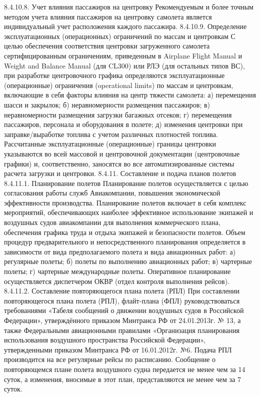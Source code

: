 8.4.10.8. Учет влияния пассажиров на центровку 
Рекомендуемым и более точным методом учета влияния пассажиров на центровку самолета является индивидуальный учет расположения каждого пассажира. 
8.4.10.9. Определение эксплуатационных (операционных) ограничений по массам и центровкам 
С целью обеспечения соответствия центровки загруженного самолета сертифицированным ограничениям, приведенным в Airplane Flight Manual и Weight and Balance Manual (для CL300) или РЛЭ (для остальных типов ВС), при разработке центровочного графика определяются эксплуатационные (операционные) ограничения (operational limits) по массам и центровкам, включающие в себя факторы влияния на центр тяжести самолета: 
а)	перемещения шасси и закрылок; 
б)	неравномерности размещения пассажиров; 
в)	неравномерности размещения загрузки багажных отсеков; 
г)	перемещения пассажиров, персонала и оборудования в полете; 
д)	изменения центровки при заправке/выработке топлива с учетом различных плотностей топлива. 
Рассчитанные эксплуатационные (операционные) границы центровки указываются во всей массовой и центровочной документации (центровочные графики) и, соответственно, заносятся во все автоматизированные системы расчета загрузки и центровки.
8.4.11. Составление и подача планов полетов
8.4.11.1. Планирование полетов
Планирование полетов осуществляется с целью согласования работы служб Авиакомпании, повышения экономической эффективности производства.
Планирование полетов включает в себя комплекс мероприятий, обеспечивающих наиболее эффективное использование экипажей и воздушных судов авиакомпании для выполнения коммерческого плана, обеспечения графика труда и отдыха экипажей и безопасности полетов.
Объем процедур предварительного и непосредственного планирования определяется в зависимости от вида предполагаемого полета и вида авиационных работ:
а)	регулярные полеты;
б)	полеты по выполнению авиационных работ;
в)	чартерные полеты;
г)	чартерные международные полеты.
Оперативное планирование осуществляется диспетчером ОКВР (отдел контроля выполнения рейсов).
8.4.11.2. Составление повторяющегося плана полета (РПЛ)
При составлении повторяющегося плана полета (РПЛ), флайт-плана (ФПЛ) руководствоваться требованиями «Табеля сообщений о движении воздушных судов в Российской Федерации», утверждённого приказом Минтранса РФ от 24.01.2013г. № 13, а также Федеральными авиационными правилами «Организация планирования использования воздушного пространства Российской Федерации», утвержденными приказом Минтранса РФ от 16.01.2012г. №6.
Подача РПЛ производится на все регулярные рейсы по расписанию. Сообщение о повторяющемся плане полета воздушного судна передается не менее чем за 14 суток, а изменения, вносимые в этот план, представляются не менее чем за 7 суток.
